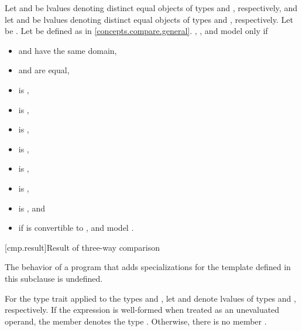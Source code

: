 \pnum
Let  and  be lvalues
denoting distinct equal objects
of types  and
, respectively, and
let  and  be lvalues denoting distinct equal objects
of types  and
, respectively.
Let  be
.
Let  be defined
as in \ref{concepts.compare.general}.
, , and 
model  only if
\begin{itemize}
\item
   and  have the same domain,
\item
   and  are equal,
\item
   is ,
\item
   is ,
\item
   is ,
\item
   is ,
\item
   is ,
\item
   is ,
\item
   is , and
\item
  if  is convertible to ,
   and  model
  .
\end{itemize}

[cmp.result]{Result of three-way comparison}

\pnum
The behavior of a program
that adds specializations for the  template
defined in this subclause is undefined.

\pnum
For the  type trait
applied to the types  and ,
let  and  denote lvalues of types
 and ,
respectively.
If the expression  is well-formed
when treated as an unevaluated operand,
the member  
denotes the type .
Otherwise, there is no member .

